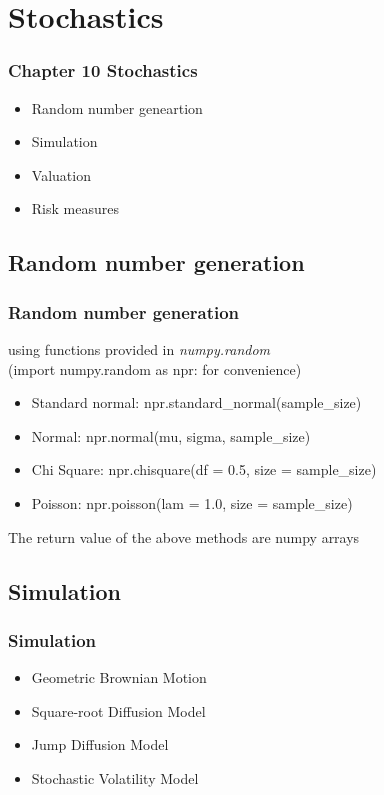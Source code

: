 \documentclass{beamer}
\begin{document}
\section{Stochastics}
\begin{frame}
\frametitle{Chapter 10 Stochastics}
\begin{itemize}
	\item Random number geneartion
	\item Simulation
	\item Valuation
	\item Risk measures
\end{itemize}
\end{frame}

\subsection{Random number generation}
\begin{frame}
\frametitle{Random number generation}
using functions provided in \emph{numpy.random}\\
(import numpy.random as npr: for convenience)
\begin{itemize}
	\item Standard normal: npr.standard\_normal(sample\_size)
	\item Normal: npr.normal(mu, sigma, sample\_size)
	\item Chi Square: npr.chisquare(df = 0.5, size = sample\_size)
	\item Poisson: npr.poisson(lam = 1.0, size = sample\_size)
\end{itemize}
The return value of the above methods are numpy arrays
\end{frame}

\subsection{Simulation}
\begin{frame}
\frametitle{Simulation}
\begin{itemize}
	\item Geometric Brownian Motion
	\item Square-root Diffusion Model
	\item Jump Diffusion Model
	\item Stochastic Volatility Model
\end{itemize}
\end{frame}
\end{document}
